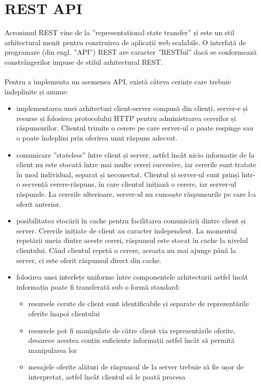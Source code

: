 \section{REST API}
Acronimul REST vine de la ”representational state transfer” și este un stil arhitectural menit pentru construirea de aplicații web scalabile.
O interfață de programare (din engl. ”API”) REST are caracter ”RESTful” dacă se conformează constrângerilor impuse de stilul arhitectural REST.
\\ \\
Pentru a implementa un asemenea API, există câteva cerințe care trebuie îndeplinite și anume:

\begin{itemize}
  \item implementarea unei arhitecturi client-server compusă din clienți, server-e și resurse și folosirea protocolului HTTP pentru administrarea cererilor și răspunsurilor. Clientul trimite o cerere pe care server-ul o poate respinge sau o poate îndeplini prin oferirea unui răspuns adecvat.
  \item comunicare ”stateless” între client și server, astfel încât nicio informație de la client nu este stocată între mai multe cereri succesive, iar cererile sunt tratate în mod individual, separat și neconectat. Clientul și server-ul sunt prinși într-o secvență cerere-răspuns, în care clientul inițiază o cerere, iar server-ul răspunde. La cererile ulterioare, server-ul nu cunoaște răspunsurile pe care l-a oferit anterior.
  \item posibilitatea stocării în cache pentru facilitarea comunicării dintre client și server. Cererile inițiate de client au caracter independent. La momentul repetării uneia dintre aceste cereri, răspunsul este stocat în cache la nivelul clientului. Când clientul repetă o cerere, aceasta nu mai ajunge până la server, ci este oferit răspunsul direct din cache.
  \item folosirea unei interfețe uniforme între componentele arhitecturii astfel încât informația poate fi transferată sub o formă standard:
	\begin{itemize}
		\item resursele cerute de client sunt identificabile și separate de reprezentările oferite înapoi clientului
		\item resursele pot fi manipulate de către client via reprezentările oferite, deoarece acestea conțin suficiente informații astfel încât să permită manipularea lor
		\item mesajele oferite alături de răspunsul de la server trebuie să fie ușor de interpretat, astfel încât clientul să le poată procesa

\end{itemize}
\end{itemize}
